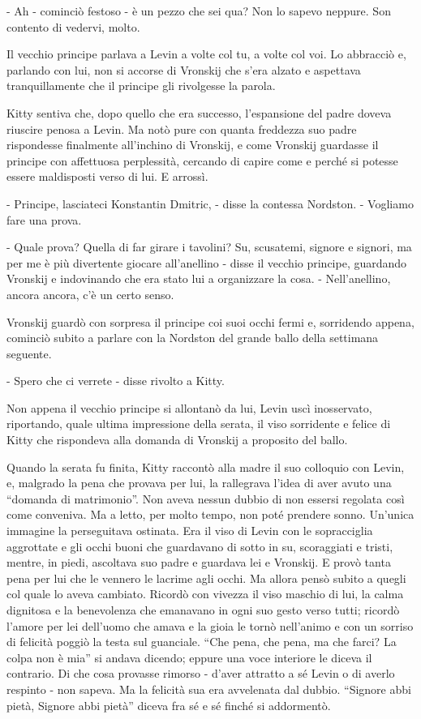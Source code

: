 - Ah - cominciò festoso - è un pezzo che sei qua? Non lo sapevo neppure. Son contento di vedervi, molto. 

Il vecchio principe parlava a Levin a volte col tu, a volte col voi. Lo abbracciò e, parlando con lui, non si accorse di Vronskij che s'era alzato e aspettava tranquillamente che il principe gli rivolgesse la parola. 

Kitty sentiva che, dopo quello che era successo, l'espansione del padre doveva riuscire penosa a Levin. Ma notò pure con quanta freddezza suo padre rispondesse finalmente all'inchino di Vronskij, e come Vronskij guardasse il principe con affettuosa perplessità, cercando di capire come e perché si potesse essere maldisposti verso di lui. E arrossì. 

- Principe, lasciateci Konstantin Dmitric, - disse la contessa Nordston. - Vogliamo fare una prova. 

- Quale prova? Quella di far girare i tavolini? Su, scusatemi, signore e signori, ma per me è più divertente giocare all'anellino - disse il vecchio principe, guardando Vronskij e indovinando che era stato lui a organizzare la cosa. - Nell'anellino, ancora ancora, c'è un certo senso. 

Vronskij guardò con sorpresa il principe coi suoi occhi fermi e, sorridendo appena, cominciò subito a parlare con la Nordston del grande ballo della settimana seguente. 

- Spero che ci verrete - disse rivolto a Kitty. 

Non appena il vecchio principe si allontanò da lui, Levin uscì inosservato, riportando, quale ultima impressione della serata, il viso sorridente e felice di Kitty che rispondeva alla domanda di Vronskij a proposito del ballo. 

Quando la serata fu finita, Kitty raccontò alla madre il suo colloquio con Levin, e, malgrado la pena che provava per lui, la rallegrava l'idea di aver avuto una ``domanda di matrimonio''. Non aveva nessun dubbio di non essersi regolata così come conveniva. Ma a letto, per molto tempo, non poté prendere sonno. Un'unica immagine la perseguitava ostinata. Era il viso di Levin con le sopracciglia aggrottate e gli occhi buoni che guardavano di sotto in su, scoraggiati e tristi, mentre, in piedi, ascoltava suo padre e guardava lei e Vronskij. E provò tanta pena per lui che le vennero le lacrime agli occhi. Ma allora pensò subito a quegli col quale lo aveva cambiato. Ricordò con vivezza il viso maschio di lui, la calma dignitosa e la benevolenza che emanavano in ogni suo gesto verso tutti; ricordò l'amore per lei dell'uomo che amava e la gioia le tornò nell'animo e con un sorriso di felicità poggiò la testa sul guanciale. ``Che pena, che pena, ma che farci? La colpa non è mia'' si andava dicendo; eppure una voce interiore le diceva il contrario. Di che cosa provasse rimorso - d'aver attratto a sé Levin o di averlo respinto - non sapeva. Ma la felicità sua era avvelenata dal dubbio. ``Signore abbi pietà, Signore abbi pietà'' diceva fra sé e sé finché si addormentò. 

